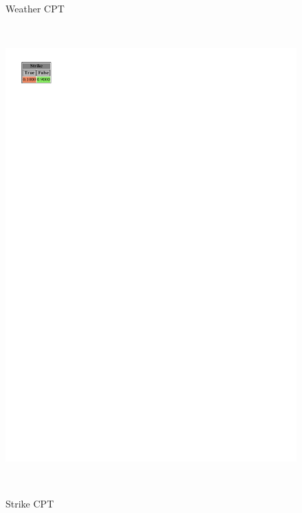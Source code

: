 \documentclass[a4paper,12pt]{article} %
\begin{document}
\begin{figure}[htb]
\begin{minipage}[c]{.3\textwidth}
		\caption{Weather CPT}
		\label{fig:weather}
	\end{minipage}
	~
	\begin{minipage}[c]{.3\textwidth}
		\centering
		\includegraphics[width=\linewidth]{../code/strike.pdf}	
		\caption{Strike CPT}
		\label{fig:strike}
	\end{minipage}
	~
	\begin{minipage}[c]{.3\textwidth}
		\centering

\end{minipage}
\end{figure}
\end{document}
